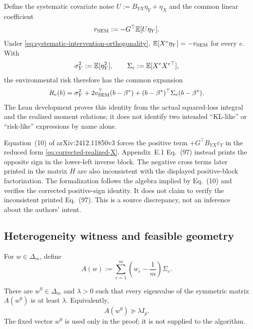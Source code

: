 Define the systematic covariate noise
$U:=B_{YX}\eta_Y+\eta_X$ and the common linear coefficient
\begin{equation}
  v_{\rm SEM}:=-G^\top\mathbb{E}[U\eta_Y].
  \label{eq:v-sem}
\end{equation}
Under \eqref{eq:systematic-intervention-orthogonality},
$\mathbb{E}[X^e\eta_Y]=-v_{\rm SEM}$ for every $e$.  With
\begin{equation}
  \sigma_Y^2:=\mathbb{E}[\eta_Y^2],
  \qquad
  \Sigma_e:=\mathbb{E}[X^eX^{e\top}],
  \label{eq:sem-moments}
\end{equation}
the environmental risk therefore has the common expansion
\begin{equation}
  R_e(b)
  =\sigma_Y^2
   +2v_{\rm SEM}^\top(b-\beta^*)
   +(b-\beta^*)^\top\Sigma_e(b-\beta^*).
  \label{eq:risk-expansion}
\end{equation}
The Lean development proves this identity from the actual squared-loss
integral and the realized moment relations; it does not identify two intended
``KL-like'' or ``risk-like'' expressions by name alone.

\begin{remark}
Equation~(10) of arXiv:2412.11850v3 forces the positive term
$+G^\top B_{YX}\varepsilon_Y$ in the reduced form
\eqref{eq:corrected-realized-X}.  Appendix~E.1 Eq.~(97) instead prints the
opposite sign in the lower-left inverse block.  The negative cross terms later
printed in the matrix $H$ are also inconsistent with the displayed
positive-block factorization.  The formalization follows the algebra implied
by Eq.~(10) and verifies the corrected positive-sign identity.  It does not
claim to verify the inconsistent printed Eq.~(97).  This is a source
discrepancy, not an inference about the authors' intent.
\end{remark}

\subsection{Heterogeneity witness and feasible geometry}

For $w\in\Delta_m$, define
\begin{equation}
  A(w):=\sum_{e=1}^m\left(w_e-\frac1m\right)\Sigma_e.
  \label{eq:heterogeneity-matrix}
\end{equation}
\begin{assumption}
\label{ass:heterogeneity}
There are $w^0\in\Delta_m$ and $\lambda>0$ such that every eigenvalue of the
symmetric matrix $A(w^0)$ is at least $\lambda$.  Equivalently,
\begin{equation}
  A(w^0)\succeq\lambda I_p.
  \label{eq:fixed-witness-condition}
\end{equation}
The fixed vector $w^0$ is used only in the proof; it is not supplied to the
algorithm.
\end{assumption}

